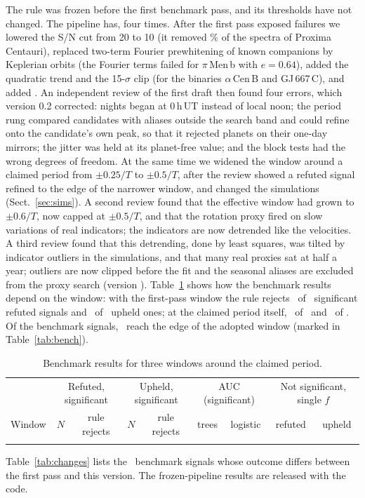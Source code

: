 The rule was frozen before the first benchmark pass, and its thresholds have not
changed. The pipeline has, four times. After the first pass exposed failures we lowered
the S/N cut from 20 to 10 (it removed \nmProxLossTwenty\% of the spectra of Proxima
Centauri), replaced two-term Fourier prewhitening of known companions by Keplerian
orbits (the Fourier terms failed for $\pi$\,Men\,b with $e = 0.64$), added the quadratic
trend and the 15-$\sigma$ clip (for the binaries $\alpha$\,Cen\,B and GJ\,667\,C), and
added . An independent review of the first draft then found
four errors, which version 0.2 corrected: nights began at 0\,h\,UT instead of
local noon; the period rung compared candidates with aliases outside the search band
and could refine onto the candidate's own peak, so that it rejected planets on their
one-day mirrors; the jitter was held at its planet-free value; and the block tests had
the wrong degrees of freedom. At the same time we widened the window around a claimed
period from $\pm0.25/T$ to $\pm0.5/T$, after the review showed a refuted signal refined to
the edge of the narrower window, and changed the simulations (Sect.~\ref{sec:sims}). A
second review found that the effective window had grown to $\pm0.6/T$, now capped at
$\pm0.5/T$, and that the rotation proxy fired on slow variations of real indicators; the
indicators are now detrended like the velocities. A third review found that this
detrending, done by least squares, was tilted by indicator outliers in the simulations,
and that many real proxies sat at half a year; outliers are now clipped before the fit and
the seasonal aliases are excluded from the proxy search (version \nmrvvetVersion).
Table~\ref{tab:window} shows how the benchmark results depend on the window: with the
first-pass window the rule rejects \nmWinQRefRej\ of \nmWinQRefSig\ significant refuted
signals and \nmWinQUpRej\ of \nmWinQUpSig\ upheld ones; at the claimed period itself,
\nmWinZRefRej\ of \nmWinZRefSig\ and \nmWinZUpRej\ of \nmWinZUpSig.
Of the benchmark signals, \nmNEdge\ reach the edge of the adopted window (marked in
Table~\ref{tab:bench}).

\begin{table}
\caption{Benchmark results for three windows around the claimed period.}
\label{tab:window}
\centering
\footnotesize
\begin{tabular}{lcccccccc}
\hline\hline
 & \multicolumn{2}{c}{Refuted, significant} & \multicolumn{2}{c}{Upheld, significant} & \multicolumn{2}{c}{AUC (significant)} & \multicolumn{2}{c}{Not significant, single $f$} \\
Window & $N$ & rule rejects & $N$ & rule rejects & trees & logistic & refuted & upheld \\
\hline
{}{tab_window_rows}
\hline
\end{tabular}
\end{table} Table~\ref{tab:changes} lists the \nmBChanged\ benchmark signals
whose outcome differs between the first pass and this version. The frozen-pipeline
results are released with the code.

